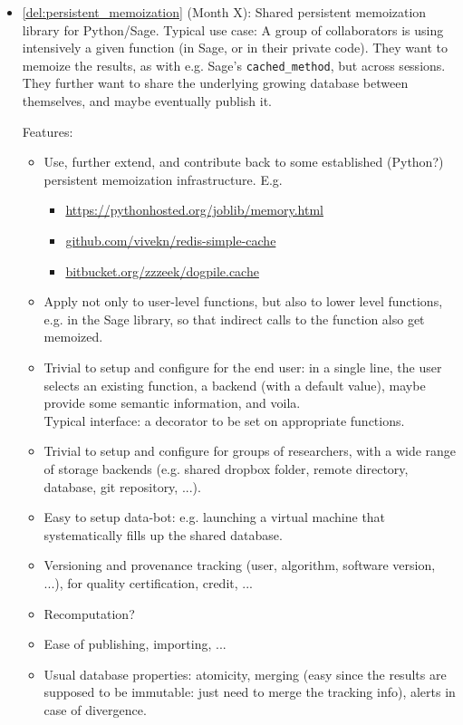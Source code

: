\begin{Workpackage}{\thewpno}
\begin{WPDeliverables}
\begin{itemize}
\item \ref{del:persistent_memoization} (Month X): Shared persistent
  memoization library for Python/Sage.  Typical use case: A group of
  collaborators is using intensively a given function (in Sage, or in
  their private code). They want to memoize the results, as with
  e.g. Sage's \lstinline{cached_method}, but across sessions.  They
  further want to share the underlying growing database between
  themselves, and maybe eventually publish it.

  Features:
  \begin{itemize}
  \item Use, further extend, and contribute back to some established
    (Python?) persistent memoization infrastructure. E.g.
    \begin{itemize}
    \item \url{https://pythonhosted.org/joblib/memory.html}
    \item \url{github.com/vivekn/redis-simple-cache}
    \item \url{bitbucket.org/zzzeek/dogpile.cache}
    \end{itemize}
  \item Apply not only to user-level functions, but also to lower
    level functions, e.g. in the Sage library, so that indirect calls
    to the function also get memoized.
  \item Trivial to setup and configure for the end user: in a single
    line, the user selects an existing function, a backend (with a
    default value), maybe provide some semantic information, and
    voila. \\
    Typical interface: a decorator to be set on appropriate functions.
  \item Trivial to setup and configure for groups of researchers, with
    a wide range of storage backends (e.g. shared dropbox folder,
    remote directory, database, git repository, ...).
  \item Easy to setup data-bot: e.g. launching a virtual machine that
    systematically fills up the shared database.
  \item Versioning and provenance tracking (user, algorithm, software
    version, ...), for quality certification, credit, ...
  \item Recomputation?
  \item Ease of publishing, importing, ...
  \item Usual database properties: atomicity, merging (easy since the
    results are supposed to be immutable: just need to merge the
    tracking info), alerts in case of divergence.
  \end{itemize}
\end{itemize}


\end{WPDeliverables}
\end{Workpackage}
